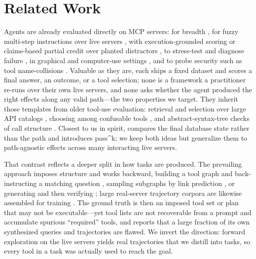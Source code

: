 \section{Related Work}
\label{sec:related}

Agents are already evaluated directly on MCP servers: for breadth
\citep{fan2025mcptoolbench++, mo2025livemcpbench, lei2025mcpverse}, for fuzzy
multi-step instructions over live servers \citep{wang2025mcp}, with
execution-grounded scoring \citep{servers25mcp, gao2025mcp} or claims-based
partial credit over planted distractors \citep{bandi2026mcp}, to stress-test and
diagnose failure \citep{wu2025mcpmark, yin2025livemcp, guo2026mcp}, in graphical
and computer-use settings \citep{yan2025mcpworld, jia2025osworld}, and to probe
security such as tool name-collisions \citep{zhang2025mcp}. Valuable as they
are, each ships a fixed dataset and scores a final answer, an outcome, or a tool
selection; none is a framework a practitioner re-runs over their own live
servers, and none asks whether the agent produced the right effects along any
valid path---the two properties we target. They inherit those templates from
older tool-use evaluation: retrieval and selection over large API catalogs
\citep{patil2024gorilla, qin2024toolllm}, choosing among confusable tools
\citep{huang2024metatool}, and abstract-syntax-tree checks of call structure
\citep{patil2025berkeley}. Closest to us in spirit, \citet{yao2024tau} compares
the final database state rather than the path and introduces
pass\textasciicircum{}k; we keep both ideas but generalize them to
path-agnostic effects across many interacting live servers.

That contrast reflects a deeper split in how tasks are produced. The prevailing
approach imposes structure and works backward, building a tool graph and
back-instructing a matching question \citep{shen2024taskbench}, sampling
subgraphs by link prediction \citep{guo2026unitoolbench}, or generating and then
verifying \citep{liu2025mcpeval, shi2025taskcraft}; large real-server trajectory
corpora are likewise assembled for training \citep{xu2025toucan}. The ground
truth is then an imposed tool set or plan that may not be executable---yet tool
lists are not recoverable from a prompt and accumulate spurious ``required''
tools, and \citet{qin2024toolllm} reports that a large fraction of its own
synthesized queries and trajectories are flawed. We invert the direction:
forward exploration on the live servers yields real trajectories that we distill
into tasks, so every tool in a task was actually used to reach the goal.

